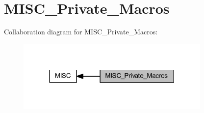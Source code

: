 \hypertarget{group___m_i_s_c___private___macros}{}\section{M\+I\+S\+C\+\_\+\+Private\+\_\+\+Macros}
\label{group___m_i_s_c___private___macros}
Collaboration diagram for M\+I\+S\+C\+\_\+\+Private\+\_\+\+Macros\+:
\nopagebreak
\begin{figure}[H]
\begin{center}
\leavevmode
\includegraphics[width=270pt]{group___m_i_s_c___private___macros}
\end{center}
\end{figure}
